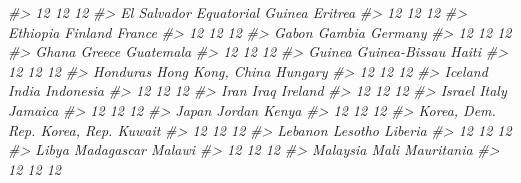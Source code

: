 \documentclass[]{book}
\newenvironment{Shaded}{\begin{snugshade}}{\end{snugshade}}
\newcommand{\CommentTok}[1]{\textcolor[rgb]{0.56,0.35,0.01}{\textit{#1}}}
\begin{document}
\begin{Shaded}
\begin{Highlighting}[]
\CommentTok{#>                       12                       12                       12 }
\CommentTok{#>              El Salvador        Equatorial Guinea                  Eritrea }
\CommentTok{#>                       12                       12                       12 }
\CommentTok{#>                 Ethiopia                  Finland                   France }
\CommentTok{#>                       12                       12                       12 }
\CommentTok{#>                    Gabon                   Gambia                  Germany }
\CommentTok{#>                       12                       12                       12 }
\CommentTok{#>                    Ghana                   Greece                Guatemala }
\CommentTok{#>                       12                       12                       12 }
\CommentTok{#>                   Guinea            Guinea-Bissau                    Haiti }
\CommentTok{#>                       12                       12                       12 }
\CommentTok{#>                 Honduras         Hong Kong, China                  Hungary }
\CommentTok{#>                       12                       12                       12 }
\CommentTok{#>                  Iceland                    India                Indonesia }
\CommentTok{#>                       12                       12                       12 }
\CommentTok{#>                     Iran                     Iraq                  Ireland }
\CommentTok{#>                       12                       12                       12 }
\CommentTok{#>                   Israel                    Italy                  Jamaica }
\CommentTok{#>                       12                       12                       12 }
\CommentTok{#>                    Japan                   Jordan                    Kenya }
\CommentTok{#>                       12                       12                       12 }
\CommentTok{#>         Korea, Dem. Rep.              Korea, Rep.                   Kuwait }
\CommentTok{#>                       12                       12                       12 }
\CommentTok{#>                  Lebanon                  Lesotho                  Liberia }
\CommentTok{#>                       12                       12                       12 }
\CommentTok{#>                    Libya               Madagascar                   Malawi }
\CommentTok{#>                       12                       12                       12 }
\CommentTok{#>                 Malaysia                     Mali               Mauritania }
\CommentTok{#>                       12                       12                       12 }

\end{Highlighting}
\end{Shaded}
\end{document}
